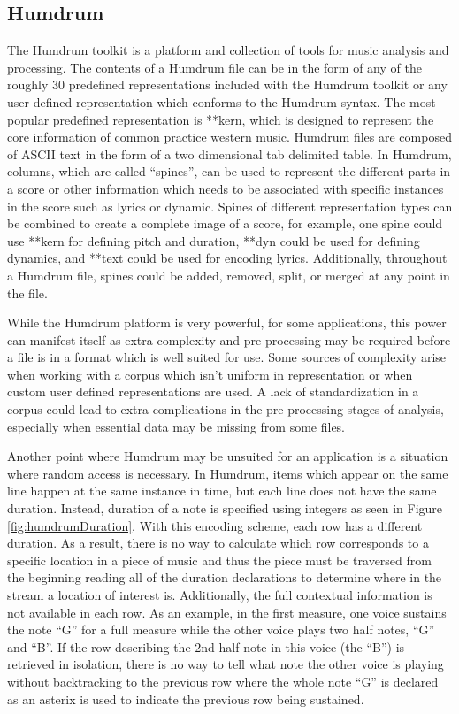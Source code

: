 \subsection{Humdrum}

The Humdrum toolkit \citep*{Huro02,Huro97} is a platform and collection of tools for music analysis and processing. The contents of a Humdrum file can be in the form of any of the roughly 30 predefined representations included with the Humdrum toolkit or any user defined representation which conforms to the Humdrum syntax. The most popular predefined representation is **kern, which is designed to represent the core information of common practice western music. Humdrum files are composed of ASCII text in the form of a two dimensional tab delimited table. In Humdrum, columns, which are called ``spines'', can be used to represent the different parts in a score or other information which needs to be associated with specific instances in the score such as lyrics or dynamic. Spines of different representation types can be combined to create a complete image of a score, for example, one spine could use **kern for defining pitch and duration, **dyn could be used for defining dynamics, and **text could be used for encoding lyrics. Additionally, throughout a Humdrum file, spines could be added, removed, split, or merged at any point in the file.

While the Humdrum platform is very powerful, for some applications, this power can manifest itself as extra complexity and pre-processing may be required before a file is in a format which is well suited for use. Some sources of complexity arise when working with a corpus which isn't uniform in representation or when custom user defined representations are used. A lack of standardization in a corpus could lead to extra complications in the pre-processing stages of analysis, especially when essential data may be missing from some files.

Another point where Humdrum may be unsuited for an application is a situation where random access is necessary. In Humdrum, items which appear on the same line happen at the same instance in time, but each line does not have the same duration. Instead, duration of a note is specified using integers as seen in Figure \ref{fig:humdrumDuration}. With this encoding scheme, each row has a different duration. As a result, there is no way to calculate which row corresponds to a specific location in a piece of music and thus the piece must be traversed from the beginning reading all of the duration declarations to determine where in the stream a location of interest is. Additionally, the full contextual information is not available in each row. As an example, in the first measure, one voice sustains the note ``G'' for a full measure while the other voice plays two half notes, ``G'' and ``B''. If the row describing the 2nd half note in this voice (the ``B'') is retrieved in isolation, there is no way to tell what note the other voice is playing without backtracking to the previous row where the whole note ``G'' is declared as an asterix is used to indicate the previous row being sustained.

